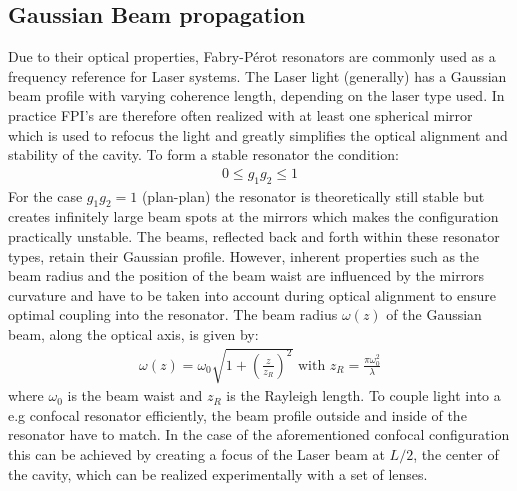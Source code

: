 \subsection{Gaussian Beam propagation}
Due to their optical properties, Fabry-Pérot resonators are commonly used as a frequency reference for Laser systems. The Laser light (generally) has a Gaussian beam profile with varying coherence length, depending on the laser type used. In practice FPI's are therefore often realized with at least one spherical mirror which is used to refocus the light and greatly simplifies the optical alignment and stability of the cavity. To form a stable resonator the condition:
\begin{align}
	0\leq g_1g_2\leq 1
\end{align}
For the case $g_1g_2=1$ (plan-plan) the resonator is theoretically still stable but creates infinitely large beam spots at the mirrors which makes the configuration practically unstable.
The beams, reflected back and forth within these resonator types, retain their Gaussian profile. However, inherent properties such as the beam radius and the position of the beam waist are influenced by the mirrors curvature and have to be taken into account during optical alignment to ensure optimal coupling into the resonator. The beam radius $\omega(z)$ of the Gaussian beam, along the optical axis, is given by:
\begin{eqnarray}
	\omega(z)=\omega_0 \sqrt{1+(\frac{z}{z_R})^2} \text{\ \ \ with \ \ \ } z_R =\frac{\pi \omega_0^2}{\lambda}
	\label{eq:FPI_gaussian_spotsize} 
\end{eqnarray}
where $\omega_0$ is the beam waist and $z_R$ is the Rayleigh length. To couple light into a e.g confocal resonator efficiently, the beam profile outside and inside of the resonator have to match. In the case of the aforementioned confocal configuration this can be achieved by creating a focus of the Laser beam at $L/2$, the center of the cavity, which can be realized experimentally with a set of lenses.
